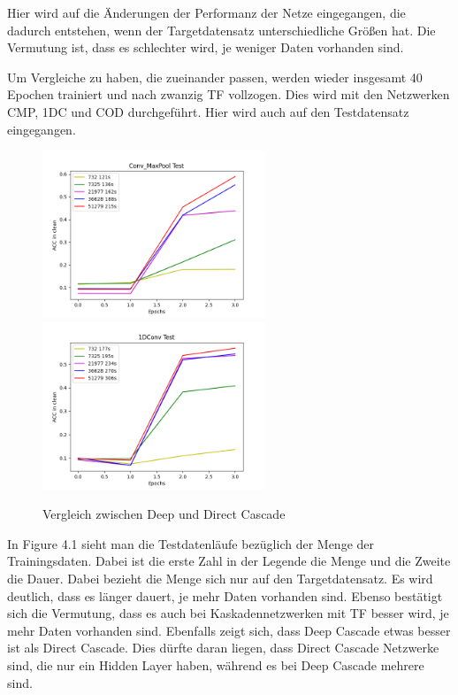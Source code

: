 Hier wird auf die Änderungen der Performanz der Netze eingegangen, die dadurch entstehen, wenn der Targetdatensatz unterschiedliche Größen hat. 
Die Vermutung ist, dass es schlechter wird, je weniger Daten vorhanden sind. 

Um Vergleiche zu haben, die zueinander passen, werden wieder insgesamt 40 Epochen trainiert und nach zwanzig TF vollzogen. Dies wird mit den 
Netzwerken 
CMP, 1DC und COD durchgeführt. Hier wird auch auf den Testdatensatz eingegangen. 

\begin{figure}[htpb]
    \includegraphics[height=5cm]{../../Plots/ba_plots/targetgroesse/cmp_ts.png}
    \includegraphics[height=5cm]{../../Plots/ba_plots/targetgroesse/1dc_ts.png}
    \caption{\label{fig:targetgroessedeepdir} Vergleich zwischen Deep und Direct Cascade}
\end{figure}

In Figure 4.1 sieht man die Testdatenläufe bezüglich der Menge der Trainingsdaten. Dabei ist die erste Zahl in der Legende die Menge und die 
Zweite die Dauer. Dabei bezieht die Menge sich nur auf den Targetdatensatz. Es wird deutlich, dass es länger dauert, je mehr Daten vorhanden sind. 
Ebenso bestätigt sich die Vermutung, dass es auch bei Kaskadennetzwerken mit TF besser wird, je mehr Daten vorhanden sind. 
Ebenfalls zeigt sich, dass Deep Cascade etwas besser ist als Direct Cascade. Dies dürfte daran liegen, dass Direct Cascade Netzwerke sind, 
die nur ein Hidden Layer haben, während es bei Deep Cascade mehrere sind. 


